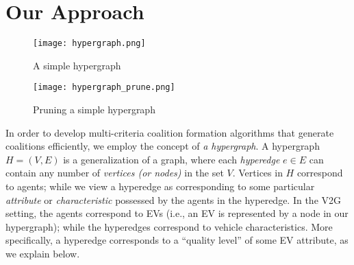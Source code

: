 
\chapter{Our Approach} %

\label{Chapter3} %







\begin{figure}
	\centering
	\texttt{[image: hypergraph.png]}
	\caption{A simple hypergraph\label{fig:hypergraph}}
\end{figure}
\begin{figure}
	\centering
		\centering
		\texttt{[image: hypergraph\_prune.png]}
		\caption{Pruning a simple hypergraph\label{fig:hypergraph_prune}}
	
\end{figure}

In order to develop multi-criteria coalition formation algorithms that generate coalitions efficiently, we employ the concept of {\em a hypergraph}.
A hypergraph $H = (V, E)$ is a generalization of a graph, where each {\em hyperedge} $e \in E$ can contain any number of {\em vertices (or nodes)} in the set $V$.
Vertices in $H$ correspond to agents; while we view a hyperedge as corresponding to some particular {\em attribute} or {\em characteristic} possessed by the agents in the hyperedge.
In the V2G setting, the agents correspond to EVs (i.e., an EV is represented by a node in our hypergraph); while the hyperedges correspond to vehicle characteristics. More specifically, a hyperedge corresponds to a ``quality level'' of some EV attribute, as we explain below.

